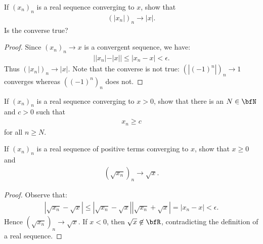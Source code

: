 \documentclass[10pt,twoside,openany]{memoir}
\begin{document}
    \begin{exercise}
        If $(x_n)_n$ is a real sequence converging to $x$, show that 
            \begin{equation*}
            \begin{split}
                (|x_n|)_n \rightarrow |x|.
            \end{split}
            \end{equation*}
        Is the converse true?
    \end{exercise}
        {\color{red} \begin{proof}
            Since $(x_n)_n \rightarrow x$ is a convergent sequence, we have:
                \begin{equation*}
                \begin{split}
                    ||x_n| - |x|| \leq |x_n - x| < \epsilon.
                \end{split}
                \end{equation*}
            Thus $(|x_n|)_n \rightarrow |x|$. Note that the converse is not true: $(|(-1)^n|)_n \rightarrow 1$ converges whereas $((-1)^n)_n$ does not. 
        \end{proof}}
    \begin{exercise}
        If $(x_n)_n$ is a real sequence converging to $x>0$, show that there is an $N \in \bfN$ and $c>0$ such that
            \begin{equation*}
            \begin{split}
                x_n \geq c
            \end{split}
            \end{equation*}
        for all $n \geq N$.
    \end{exercise}
    \begin{exercise}
        If $(x_n)_n$ is a real sequence of positive terms converging to $x$, show that $x \geq 0$ and
            \begin{equation*}
            \begin{split}
                (\sqrt{x_n})_n \rightarrow \sqrt{x}.
            \end{split}
            \end{equation*}
        
            {\color{red} \begin{proof}
                Observe that:
                    \begin{equation*}
                    \begin{split}
                        \left|\sqrt{x_n} - \sqrt{x}\right| \leq \left|\sqrt{x_n}-\sqrt{x}\right|\left|\sqrt{x_n} + \sqrt{x}\right| = \left|x_n - x\right| < \epsilon.
                    \end{split}
                    \end{equation*}
                Hence $(\sqrt{x_n})_n \rightarrow \sqrt{x}$. If $x < 0$, then $\sqrt{x} \not\in \bfR$, contradicting the definition of a real sequence.
            \end{proof}}
    \end{exercise}
\end{document}

